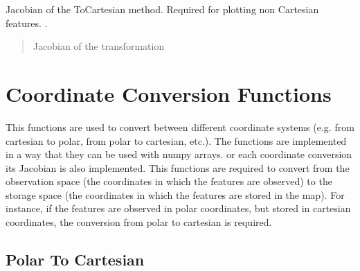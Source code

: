 \documentclass[letterpaper,10pt,english]{sphinxmanual}
\begin{document}
\begin{fulllineitems}
\begin{fulllineitems}
\begin{quote}
\begin{description}
\end{description}\end{quote}

\end{fulllineitems}


\begin{fulllineitems}
\label{\detokenize{Feature:Feature.PolarFeature.J_2c}}
\pysigstartsignatures
{}
\pysigstopsignatures
\sphinxAtStartPar
Jacobian of the ToCartesian method. Required for plotting non Cartesian features.
.
\begin{quote}\begin{description}
\sphinxAtStartPar
Jacobian of the transformation

\end{description}\end{quote}

\end{fulllineitems}


\end{fulllineitems}


\sphinxstepscope


\section{Coordinate Conversion Functions}
\label{\detokenize{conversions:coordinate-conversion-functions}}\label{\detokenize{conversions::doc}}
\sphinxAtStartPar
This functions are used to convert between different coordinate systems (e.g. from cartesian to polar, from polar to
cartesian, etc.). The functions are implemented in a way that they can be used with numpy arrays. or each coordinate
conversion its Jacobian is also implemented.
This functions are required to convert from the observation space (the coordinates in which the features are observed)
to the storage space (the coordinates in which the features are stored in the map). For instance, if the features are
observed in polar coordinates, but stored in cartesian coordinates, the conversion from polar to cartesian is required.


\subsection{Polar To Cartesian}
\label{\detokenize{conversions:polar-to-cartesian}}
\end{document}
